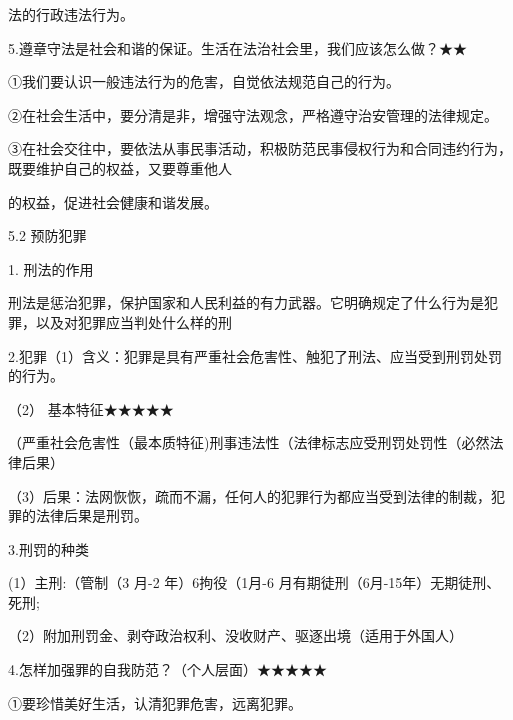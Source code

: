 \documentclass[lang=cn,11pt]{elegantbook}
\newcommand{\daofasym}[1]{{\daofasymbolfont #1}}
\newcommand{\daofasym}[1]{#1}
\begin{document}
法的行政违法行为。\par

5.遵章守法是社会和谐的保证。生活在法治社会里，我们应该怎么做？\daofasym{★}\daofasym{★}\par

\daofasym{①}我们要认识一般违法行为的危害，自觉依法规范自己的行为。\par

\daofasym{②}在社会生活中，要分清是非，增强守法观念，严格遵守治安管理的法律规定。\par

\daofasym{③}在社会交往中，要依法从事民事活动，积极防范民事侵权行为和合同违约行为，既要维护自己的权益，又要尊重他人\par

的权益，促进社会健康和谐发展。\par

5.2 预防犯罪\par

1. 刑法的作用\par

刑法是惩治犯罪，保护国家和人民利益的有力武器。它明确规定了什么行为是犯罪，以及对犯罪应当判处什么样的刑\par

2.犯罪（1）含义：犯罪是具有严重社会危害性、触犯了刑法、应当受到刑罚处罚的行为。\par

（2） 基本特征\daofasym{★}\daofasym{★}\daofasym{★}\daofasym{★}\daofasym{★}\par

（严重社会危害性（最本质特征)刑事违法性（法律标志应受刑罚处罚性（必然法律后果）\par

（3）后果：法网恢恢，疏而不漏，任何人的犯罪行为都应当受到法律的制裁，犯罪的法律后果是刑罚。\par

3.刑罚的种类\par

(1）主刑:（管制（3 月-2 年）6拘役（1月-6 月有期徒刑（6月-15年）无期徒刑、死刑;\par

（2）附加刑罚金、剥夺政治权利、没收财产、驱逐出境（适用于外国人）\par

4.怎样加强罪的自我防范？（个人层面）\daofasym{★}\daofasym{★}\daofasym{★}\daofasym{★}\daofasym{★}\par

\daofasym{①}要珍惜美好生活，认清犯罪危害，远离犯罪。\par
\end{document}
